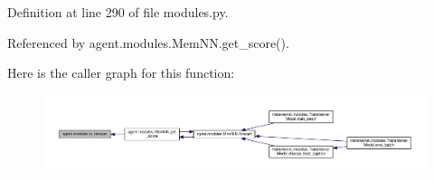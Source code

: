Definition at line 290 of file modules.\+py.



Referenced by agent.\+modules.\+Mem\+N\+N.\+get\+\_\+score().

Here is the caller graph for this function\+:
\nopagebreak
\begin{figure}[H]
\begin{center}
\leavevmode
\includegraphics[width=350pt]{namespaceagent_1_1modules_ab14a28f51a478876887e38d054c142dc_icgraph}
\end{center}
\end{figure}
